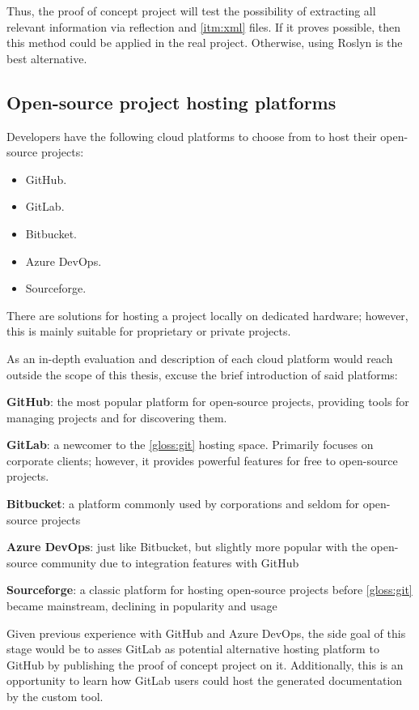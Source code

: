 Thus, the proof of concept project will test the possibility of extracting all relevant information via reflection and \ref{itm:xml} files. If it proves possible, then this method could be applied in the real project. Otherwise, using Roslyn is the best alternative.

\subsection{Open-source project hosting platforms}
Developers have the following cloud platforms to choose from to host their open-source projects:
\begin{itemize}
    \item GitHub.
    \item GitLab.
    \item Bitbucket.
    \item Azure DevOps.
    \item Sourceforge.
\end{itemize}

There are solutions for hosting a project locally on dedicated hardware; however, this is mainly suitable for proprietary or private projects.

As an in-depth evaluation and description of each cloud platform would reach outside the scope of this thesis, excuse the brief introduction of said platforms:

\textbf{GitHub}: the most popular platform for open-source projects, providing tools for managing projects and for discovering them.

\textbf{GitLab}: a newcomer to the \ref{gloss:git} hosting space. Primarily focuses on corporate clients; however, it provides powerful features for free to open-source projects.

\textbf{Bitbucket}: a platform commonly used by corporations and seldom for open-source projects

\textbf{Azure DevOps}: just like Bitbucket, but slightly more popular with the open-source community due to integration features with GitHub

\textbf{Sourceforge}: a classic platform for hosting open-source projects before \ref{gloss:git} became mainstream, declining in popularity and usage

Given previous experience with GitHub and Azure DevOps, the side goal of this stage would be to asses GitLab as potential alternative hosting platform to GitHub by publishing the proof of concept project on it. Additionally, this is an opportunity to learn how GitLab users could host the generated documentation by the custom tool.

